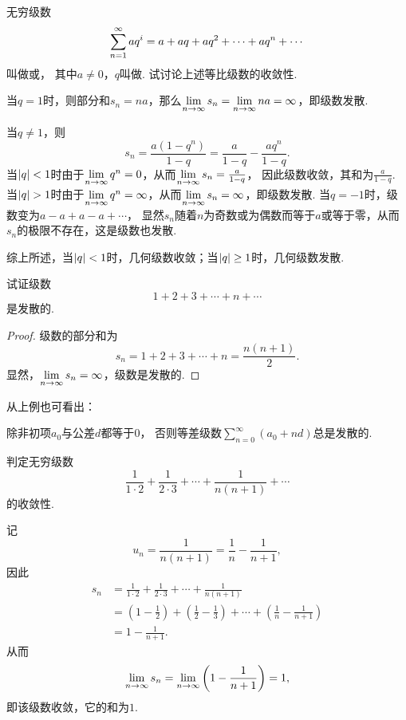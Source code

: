 \begin{example}\label{example:无穷级数.等比级数的收敛性}
无穷级数\[
	\sum\limits_{n=1}^\infty a q^i = a+aq+aq^2+\dotsb+aq^n+\dotsb
\]
叫做或，
其中\(a \neq 0\)，\(q\)叫做.
试讨论上述等比级数的收敛性.
\begin{solution}
当\(q = 1\)时，则部分和\(s_n=na\)，那么\(\lim\limits_{n\to\infty} s_n = \lim\limits_{n\to\infty} na = \infty\)，即级数发散.

当\(q \neq 1\)，则\[
s_n = \frac{a(1-q^n)}{1-q} = \frac{a}{1-q} - \frac{aq^n}{1-q}.
\]
当\(\abs{q} < 1\)时由于\(\lim\limits_{n\to\infty} q^n=0\)，从而\(\lim\limits_{n\to\infty} s_n=\frac{a}{1-q}\)，
因此级数收敛，其和为\(\frac{a}{1-q}\).
当\(\abs{q} > 1\)时由于\(\lim\limits_{n\to\infty} q^n=\infty\)，从而\(\lim\limits_{n\to\infty} s_n=\infty\)，即级数发散.
当\(q = -1\)时，级数变为\(a-a+a-a+\dotsb\)，
显然\(s_n\)随着\(n\)为奇数或为偶数而等于\(a\)或等于零，从而\(s_n\)的极限不存在，这是级数也发散.

综上所述，{\color{red}当\(\abs{q} < 1\)时，几何级数收敛；当\(\abs{q} \geq 1\)时，几何级数发散.}
\end{solution}
\end{example}

\begin{example}\label{example:无穷级数.等差级数的收敛性}
试证级数\[
1+2+3+\dotsb+n+\dotsb
\]是发散的.
\begin{proof}
级数的部分和为\[
s_n = 1+2+3+\dotsb+n = \frac{n(n+1)}{2}.
\]显然，\(\lim\limits_{n\to\infty} s_n=\infty\)，级数是发散的.
\end{proof}
\end{example}
从上例也可看出：
\begin{proposition}
除非初项\(a_0\)与公差\(d\)都等于\(0\)，
否则等差级数\(\sum\limits_{n=0}^\infty(a_0+nd)\)总是发散的.
\end{proposition}

\begin{example}
判定无穷级数\[
\frac{1}{1\cdot2}+\frac{1}{2\cdot3}+\dotsb+\frac{1}{n(n+1)}+\dotsb
\]的收敛性.
\begin{solution}
记\[
	u_n = \frac{1}{n(n+1)} = \frac{1}{n}-\frac{1}{n+1},
\]
因此\begin{align*}
	s_n &= \frac{1}{1\cdot2}+\frac{1}{2\cdot3}+\dotsb+\frac{1}{n(n+1)} \\
	&= \left(1-\frac{1}{2}\right)+\left(\frac{1}{2}-\frac{1}{3}\right)
	+\dotsb+\left(\frac{1}{n}-\frac{1}{n+1}\right) \\
	&= 1-\frac{1}{n+1}.
\end{align*}
从而\[
	\lim\limits_{n\to\infty} s_n = \lim\limits_{n\to\infty} \left(1-\frac{1}{n+1}\right) = 1,
\]
即该级数收敛，它的和为\(1\).
\end{solution}
\end{example}


